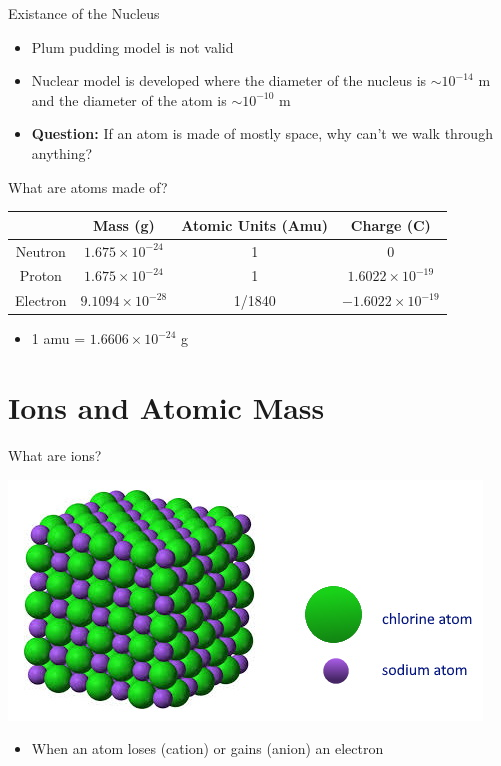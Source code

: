 \documentclass[11pt]{beamer}
\begin{document}
\begin{frame}{Existance of the Nucleus}
  \begin{itemize}
  \item Plum pudding model is not valid
  \item Nuclear model is developed where the diameter of the nucleus
    is $\sim 10^{-14}$ m and the diameter of the atom is $\sim 10^{-10}$ m
  \item \textbf{Question:} If an atom is made of mostly space,
    why can't we walk through anything?
  \end{itemize}
\end{frame}

\begin{frame}{What are atoms made of?}
  \centering
  \begin{tabular}{c|ccc}
    & Mass (g) & Atomic Units (Amu) & Charge (C) \\
    \hline
    Neutron  & $1.675\times 10^{-24}$ & 1 & 0 \\
    Proton   & $1.675\times 10^{-24}$ & 1 & $1.6022\times 10^{-19}$ \\
    Electron & $9.1094\times 10^{-28}$ & 1/1840 & $-1.6022\times 10^{-19}$
  \end{tabular}

  \begin{itemize}
  \item 1 amu = $1.6606 \times 10^{-24}$ g
  \end{itemize}
\end{frame}

\section{Ions and Atomic Mass}

\begin{frame}{What are ions?}
  \begin{center}
    \includegraphics[scale=0.5]{nacl}
  \end{center}

  \begin{itemize}
  \item When an atom loses (cation) or gains (anion) an electron
  \end{itemize}
\end{frame}
\end{document}
